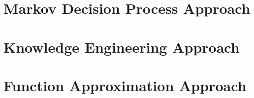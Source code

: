 \section{Markov Decision Process Approach}
\section{Knowledge Engineering Approach}
\section{Function Approximation Approach}
